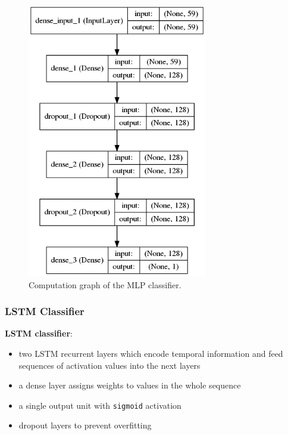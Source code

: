 \documentclass[11pt,a4paper,titlepage]{article}
\begin{document}
\begin{figure}[htbp]
  \centering
  \includegraphics[width=0.7\textwidth]{model-mlp.png}
  \caption{Computation graph of the MLP classifier.} \label{fig:mlp}
\end{figure}

\newpage

\subsubsection{LSTM Classifier}

\begin{mdframed}
\noindent \textbf{LSTM classifier}:
\begin{itemize}
  \item two LSTM recurrent layers which encode temporal information and feed sequences of activation values into the next layers
  \item a dense layer assigns weights to values in the whole sequence
  \item a single output unit with \texttt{sigmoid} activation
  \item dropout \cite{srivastava2014dropout} layers to prevent overfitting
\end{itemize}
\end{mdframed}
\end{document}
